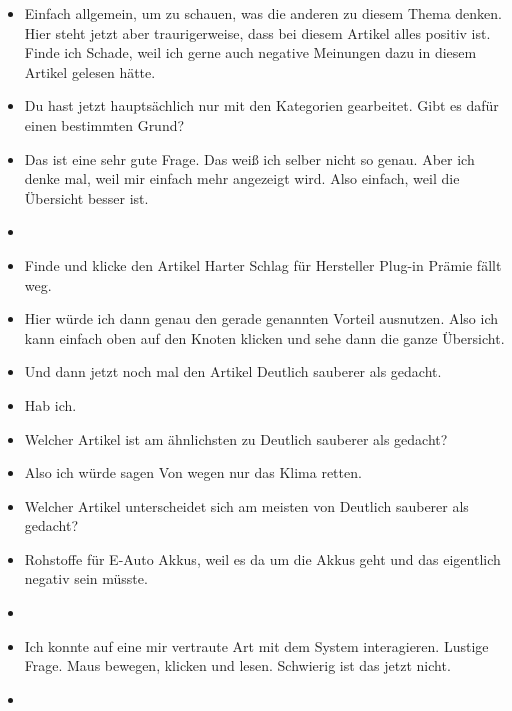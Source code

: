 {\begin{itemize}[]
            \item {} Einfach allgemein, um zu schauen, was die anderen zu diesem Thema denken.
                  Hier steht jetzt aber traurigerweise, dass bei diesem Artikel alles positiv ist.
                  Finde ich Schade, weil ich gerne auch negative Meinungen dazu in diesem Artikel gelesen hätte.
            \item {} Du hast jetzt hauptsächlich nur mit den Kategorien gearbeitet.
                  Gibt es dafür einen bestimmten Grund?
            \item {} Das ist eine sehr gute Frage.
                  Das weiß ich selber nicht so genau.
                  Aber ich denke mal, weil mir einfach mehr angezeigt wird.
                  Also einfach, weil die Übersicht besser ist.
            \item {}
            \item {} Finde und klicke den Artikel \flqq Harter Schlag für Hersteller Plug-in Prämie fällt weg\frqq{}.
            \item {} Hier würde ich dann genau den gerade genannten Vorteil ausnutzen.
                  Also ich kann einfach oben auf den Knoten klicken und sehe dann die ganze Übersicht.
            \item {} Und dann jetzt noch mal den Artikel \flqq Deutlich sauberer als gedacht\frqq{}.
            \item {} Hab ich.
            \item {} Welcher Artikel ist am ähnlichsten zu \flqq Deutlich sauberer als gedacht\frqq{}?
            \item {} Also ich würde sagen \flqq Von wegen nur das Klima retten\frqq{}.
            \item {} Welcher Artikel unterscheidet sich am meisten von \flqq Deutlich sauberer als gedacht\frqq{}?
            \item {} \flqq Rohstoffe für E-Auto Akkus\frqq{}, weil es da um die Akkus geht und das eigentlich negativ sein müsste.
            \item {}
            \item {} Ich konnte auf eine mir vertraute Art mit dem System interagieren.
                  Lustige Frage.
                  Maus bewegen, klicken und lesen.
                  Schwierig ist das jetzt nicht.
            \item {}

\end{itemize}}
